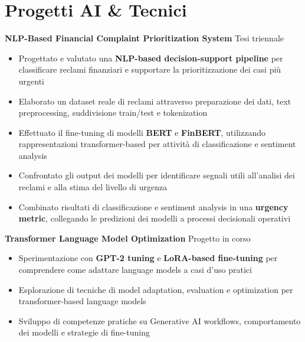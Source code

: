 \documentclass[11pt]{article}
\begin{document}

\section*{Progetti AI \& Tecnici}

\textbf{NLP-Based Financial Complaint Prioritization System} \hfill {\color{textgray}Tesi triennale} \\[-0.8em]
\begin{itemize}
\item Progettato e valutato una \textbf{NLP-based decision-support pipeline} per classificare reclami finanziari e supportare la prioritizzazione dei casi più urgenti
\item Elaborato un dataset reale di reclami attraverso preparazione dei dati, text preprocessing, suddivisione train/test e tokenization
\item Effettuato il fine-tuning di modelli \textbf{BERT} e \textbf{FinBERT}, utilizzando rappresentazioni transformer-based per attività di classificazione e sentiment analysis
\item Confrontato gli output dei modelli per identificare segnali utili all’analisi dei reclami e alla stima del livello di urgenza
\item Combinato risultati di classificazione e sentiment analysis in una \textbf{urgency metric}, collegando le predizioni dei modelli a processi decisionali operativi
\end{itemize}

\vspace{4pt}

\textbf{Transformer Language Model Optimization} \hfill {\color{textgray}Progetto in corso} \\[-0.8em]
\begin{itemize}
\item Sperimentazione con \textbf{GPT-2 tuning} e \textbf{LoRA-based fine-tuning} per comprendere come adattare language models a casi d’uso pratici
\item Esplorazione di tecniche di model adaptation, evaluation e optimization per transformer-based language models
\item Sviluppo di competenze pratiche su Generative AI workflows, comportamento dei modelli e strategie di fine-tuning
\end{itemize}

\vspace{4pt}
\end{document}
